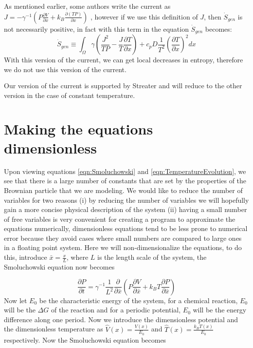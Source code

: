 As mentioned earlier, some authors write the current as $J = - \gamma^{-1} (P \frac{\partial V}{\partial x} + k_B \frac{\partial (T P)}{\partial x})$ \cite{Gardiner2009,Kramers1940}, however if we use this definition of $J$, then $\dot{S}_{gen}$ is not necessarily positive, in fact with this term in the equation $\dot{S}_{gen}$ becomes:
\begin{equation}
\dot{S}_{gen} \equiv \int_{\Omega} \gamma \left(\frac{J^2}{T P} - \frac{J}{T} \frac{\partial T}{\partial x} \right) + c_p D \frac{1}{T^2} \left(\frac{\partial T}{\partial x} \right)^2 dx 
\end{equation}
With this version of the current, we can get local decreases in entropy, therefore we do not use this version of the current.

Our version of the current is supported by Streater \cite{Streater1997, Streater1997a,Streater2000,Streater1997b} and will reduce to the other version in the case of constant temperature.

\section{Making the equations dimensionless}  \label{dimensionless}

Upon viewing equations \ref{eqn:Smoluchowski} and \ref{eqn:TemperatureEvolution}, we see that there is a large number of constants that are set by the properties of the Brownian particle that we are modeling. We would like to reduce the number of variables for two reasons (i) by reducing the number of variables we will hopefully gain a more concise physical description of the system (ii) having a small number of free variables is very convenient for creating a program to approximate the equations numerically, dimensionless equations tend to be less prone to numerical error because they avoid cases where small numbers are compared to large ones in a floating point system.
Here we will non-dimensionalize the equations, to do this, introduce $\bar{x} = \frac{x}{L}$, where $L$ is the length scale of the system, the Smoluchowski equation now becomes

\begin{equation}
\frac{\partial P}{\partial t} = \gamma^{-1}\frac{1}{L^2} \frac{\partial}{\partial \bar{x}} \left (P \frac{\partial V}{\partial \bar{x}} + k_B T \frac{\partial P}{\partial \bar{x}} \right )
\end{equation}
Now let $E_0$ be the characteristic energy of the system, for a chemical reaction, $E_0$ will be the $\Delta G$ of the reaction and for a periodic potential, $E_0$ will be the energy difference along one period. Now we introduce the dimensionless potential and the dimensionless temperature as $\hat{V}(x) = \frac{V(x)}{E_0}$ and $\hat{T}(x) = \frac{k_B T(x)}{E_0}$ respectively. Now the Smoluchowski equation becomes

